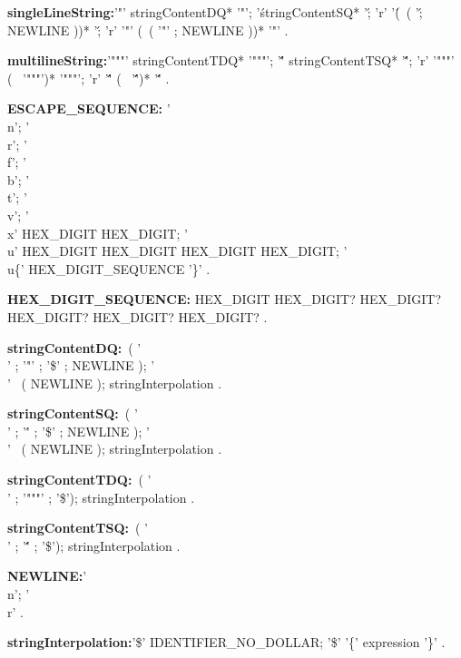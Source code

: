 \begin{grammar}
 {\bf singleLineString:}'"' stringContentDQ* '"';
       '\' stringContentSQ* '\';
      'r' '\' (~( '\' ; NEWLINE ))* '\';
      'r' '"' (~( '"' ; NEWLINE ))* '"'
    .
\end{grammar}
\begin{grammar}
 {\bf multilineString:}'"""' stringContentTDQ*   '"""';
      '\'\'\'' stringContentTSQ* '\'\'\'';
      'r' '"""'  (~ '"""')*   '"""';
      'r' '\'\'\'' (~ '\'\'\'')* '\'\'\''
    .
    
    
    {\bf ESCAPE_SEQUENCE:} '\\n';
    '\\r';
   '\\f';
   '\\b';
  '\\t';
   '\\v';
  '\\x' HEX_DIGIT HEX_DIGIT;
   '\\u' HEX_DIGIT HEX_DIGIT HEX_DIGIT HEX_DIGIT;
   '\\u\{' HEX_DIGIT_SEQUENCE '\}'
  .
  
{\bf HEX_DIGIT_SEQUENCE:}
     HEX_DIGIT HEX_DIGIT? HEX_DIGIT? HEX_DIGIT? HEX_DIGIT? HEX_DIGIT? 
    .
   
\end{grammar}
\begin{grammar}
 {\bf stringContentDQ:}~( '\\' ; '"' ; '\$' ; NEWLINE );
      '\\'  ~( NEWLINE );
     stringInterpolation
    .

 {\bf stringContentSQ:}~( '\\' ; '\'' ; '\$' ; NEWLINE );
      '\\'  ~( NEWLINE );
     stringInterpolation
    .

    
 {\bf stringContentTDQ:}~( '\\' ;  '"""' ; '\$');
     stringInterpolation
    .    

 {\bf stringContentTSQ:}~( '\\' ; '\'\'\'' ; '\$');
     stringInterpolation
    .
    
{\bf NEWLINE:}'\\n';
      '\\r'
    .

 \end{grammar}
\begin{grammar}
{\bf stringInterpolation:}'\$' IDENTIFIER_NO_DOLLAR;
      '\$' '\{' expression '\}' %
    .
 \end{grammar}
